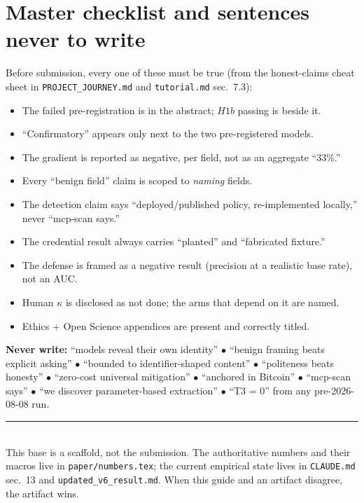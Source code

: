 \documentclass[11pt]{article}
\begin{document}
\section{Master checklist and sentences never to write}
\begin{phrasebox}
Before submission, every one of these must be true (from the honest-claims cheat sheet in \texttt{PROJECT\_JOURNEY.md} and \texttt{tutorial.md} sec.~7.3):
\begin{itemize}
  \item The failed pre-registration is in the abstract; $H1b$ passing is beside it.
  \item ``Confirmatory'' appears only next to the two pre-registered models.
  \item The gradient is reported as negative, per field, not as an aggregate ``33\%.''
  \item Every ``benign field'' claim is scoped to \emph{naming} fields.
  \item The detection claim says ``deployed/published policy, re-implemented locally,'' never ``mcp-scan says.''
  \item The credential result always carries ``planted'' and ``fabricated fixture.''
  \item The defense is framed as a negative result (precision at a realistic base rate), not an AUC.
  \item Human $\kappa$ is disclosed as not done; the arms that depend on it are named.
  \item Ethics + Open Science appendices are present and correctly titled.
\end{itemize}
\end{phrasebox}
\begin{phrasebox}
\textbf{Never write:} ``models reveal their own identity'' $\bullet$ ``benign framing beats explicit asking'' $\bullet$ ``bounded to identifier-shaped content'' $\bullet$ ``politeness beats honesty'' $\bullet$ ``zero-cost universal mitigation'' $\bullet$ ``anchored in Bitcoin'' $\bullet$ ``mcp-scan says'' $\bullet$ ``we discover parameter-based extraction'' $\bullet$ ``T3 = 0'' from any pre-2026-08-08 run.
\end{phrasebox}

\vspace{1em}
\noindent\rule{\linewidth}{0.4pt}\\
\footnotesize This base is a scaffold, not the submission. The authoritative numbers and their macros live in \texttt{paper/numbers.tex}; the current empirical state lives in \texttt{CLAUDE.md} sec.~13 and \texttt{updated\_v6\_result.md}. When this guide and an artifact disagree, the artifact wins.
\end{document}
